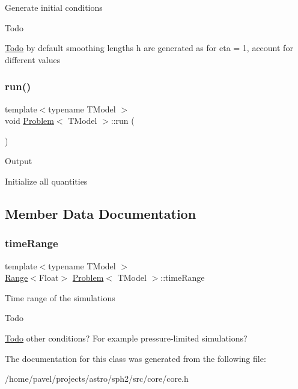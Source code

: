 Generate initial conditions

\begin{DoxyRefDesc}{Todo}
\item[\hyperlink{todo__todo000002}{Todo}]by default smoothing lengths h are generated as for eta = 1, account for different values \end{DoxyRefDesc}
\hypertarget{classProblem_a8e9921afda2d764af0e04fe0e632f993}{}\label{classProblem_a8e9921afda2d764af0e04fe0e632f993} 
\subsubsection{\texorpdfstring{run()}{run()}}
{\footnotesize\ttfamily template$<$typename T\+Model $>$ \\
void \hyperlink{classProblem}{Problem}$<$ T\+Model $>$\+::run (\begin{DoxyParamCaption}{ }\end{DoxyParamCaption})\hspace{0.3cm}{\ttfamily [inline]}}

Output

Initialize all quantities 

\subsection{Member Data Documentation}
\hypertarget{classProblem_ac375fb4749fa6006cdf4705b238deed9}{}\label{classProblem_ac375fb4749fa6006cdf4705b238deed9} 
\subsubsection{\texorpdfstring{time\+Range}{timeRange}}
{\footnotesize\ttfamily template$<$typename T\+Model $>$ \\
\hyperlink{classRange}{Range}$<$Float$>$ \hyperlink{classProblem}{Problem}$<$ T\+Model $>$\+::time\+Range}

Time range of the simulations \begin{DoxyRefDesc}{Todo}
\item[\hyperlink{todo__todo000001}{Todo}]other conditions? For example pressure-\/limited simulations? \end{DoxyRefDesc}


The documentation for this class was generated from the following file\+:\begin{DoxyCompactItemize}
\item 
/home/pavel/projects/astro/sph2/src/core/core.\+h\end{DoxyCompactItemize}
